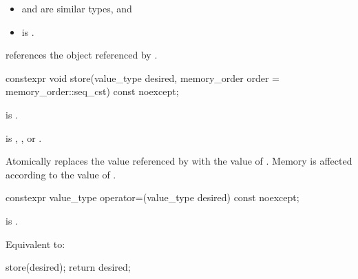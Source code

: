 \begin{itemdescr}
\pnum
\constraints
\begin{itemize}
\item {} and  are similar types, and
\item {} is .
\end{itemize}

\pnum
\ensures
{} references the object referenced by .
\end{itemdescr}

%
%
%
%
\begin{itemdecl}
constexpr void store(value_type desired,
                     memory_order order = memory_order::seq_cst) const noexcept;
\end{itemdecl}

\begin{itemdescr}
\pnum
\constraints
{} is .

\pnum
\expects
{} is
,
, or
.

\pnum
\effects
Atomically replaces the value referenced by 
with the value of .
Memory is affected according to the value of .
\end{itemdescr}

%
%
%
%
\begin{itemdecl}
constexpr value_type operator=(value_type desired) const noexcept;
\end{itemdecl}

\begin{itemdescr}
\pnum
\constraints
{} is .

\pnum
\effects
Equivalent to:
\begin{codeblock}
store(desired);
return desired;
\end{codeblock}
\end{itemdescr}

